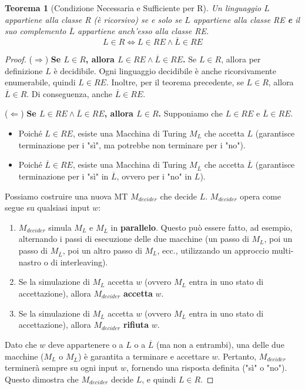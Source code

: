 \documentclass[a4paper, 11pt]{book} %
\newtheorem{theorem}{Teorema}[section]
\theoremstyle{definition}
\begin{document}
\begin{theorem}[Condizione Necessaria e Sufficiente per R]
Un linguaggio $L$ appartiene alla classe R (è ricorsivo) se e solo se $L$ appartiene alla classe RE \textbf{e} il suo complemento $\overline{L}$ appartiene anch'esso alla classe RE.
\[ L \in R \iff L \in RE \land \overline{L} \in RE \]
\end{theorem}
\begin{proof}
($\Rightarrow$) \textbf{Se $L \in R$, allora $L \in RE \land \overline{L} \in RE$.}
Se $L \in R$, allora per definizione $L$ è decidibile. Ogni linguaggio decidibile è anche ricorsivamente enumerabile, quindi $L \in RE$.
Inoltre, per il teorema precedente, se $L \in R$, allora $\overline{L} \in R$. Di conseguenza, anche $\overline{L} \in RE$.

($\Leftarrow$) \textbf{Se $L \in RE \land \overline{L} \in RE$, allora $L \in R$.}
Supponiamo che $L \in RE$ e $\overline{L} \in RE$.
\begin{itemize}
    \item Poiché $L \in RE$, esiste una Macchina di Turing $M_L$ che accetta $L$ (garantisce terminazione per i "sì", ma potrebbe non terminare per i "no").
    \item Poiché $\overline{L} \in RE$, esiste una Macchina di Turing $M_{\overline{L}}$ che accetta $\overline{L}$ (garantisce terminazione per i "sì" in $\overline{L}$, ovvero per i "no" in $L$).
\end{itemize}
Possiamo costruire una nuova MT $M_{decider}$ che decide $L$. $M_{decider}$ opera come segue su qualsiasi input $w$:
\begin{enumerate}
    \item $M_{decider}$ simula $M_L$ e $M_{\overline{L}}$ in \textbf{parallelo}. Questo può essere fatto, ad esempio, alternando i passi di esecuzione delle due macchine (un passo di $M_L$, poi un passo di $M_{\overline{L}}$, poi un altro passo di $M_L$, ecc., utilizzando un approccio multi-nastro o di interleaving).
    \item Se la simulazione di $M_L$ accetta $w$ (ovvero $M_L$ entra in uno stato di accettazione), allora $M_{decider}$ \textbf{accetta} $w$.
    \item Se la simulazione di $M_{\overline{L}}$ accetta $w$ (ovvero $M_{\overline{L}}$ entra in uno stato di accettazione), allora $M_{decider}$ \textbf{rifiuta} $w$.
\end{enumerate}
Dato che $w$ deve appartenere o a $L$ o a $\overline{L}$ (ma non a entrambi), una delle due macchine ($M_L$ o $M_{\overline{L}}$) è garantita a terminare e accettare $w$. Pertanto, $M_{decider}$ terminerà sempre su ogni input $w$, fornendo una risposta definita ("sì" o "no"). Questo dimostra che $M_{decider}$ decide $L$, e quindi $L \in R$.
\end{proof}
\end{document}
